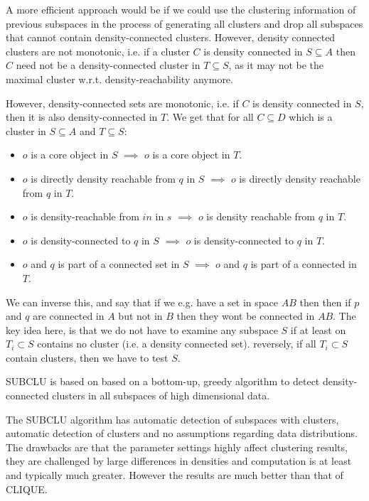     A more efficient approach would be if we could use the clustering 
    information of previous subspaces in the process of generating all clusters 
    and drop all subspaces that cannot contain density-connected clusters. 
    However, density connected clusters are not monotonic, i.e. if a cluster 
    $C$ is density connected in $S \subseteq A$ then $C$ need not be a 
    density-connected cluster in $T \subseteq S$, as it may not be the maximal 
    cluster w.r.t. density-reachability anymore. 
    
    However, density-connected sets are monotonic, i.e. if $C$ is density 
    connected in $S$, then it is also density-connected in $T$. We get that for 
    all $C \subseteq D$ which is a cluster in $S \subseteq A$ and $T \subseteq 
    S$:
    
    \begin{itemize}
        \item $o$ is a core object in $S$ $\implies$ $o$ is a core object in 
        $T$.
        \item $o$ is directly density reachable from $q$ in $S$ $\implies$ $o$ 
        is directly density reachable from $q$ in $T$.
        \item $o$ is density-reachable from $in$ in $s$ $\implies$ $o$ is 
        density reachable from $q$ in $T$.
        \item $o$ is density-connected to $q$ in $S$ $\implies$ $o$ is 
        density-connected to $q$ in $T$.
        \item $o$ and $q$ is part of a connected set in $S$ $\implies$ $o$ and 
        $q$ is part of a connected in $T$.
    \end{itemize}

    We can inverse this, and say that if we e.g. have a set in space $AB$ then 
    then if $p$ and $q$ are connected in $A$ but not in $B$ then they wont be 
    connected in $AB$. The key idea here, is that we do not have to examine any 
    subspace $S$ if at least on $T_i \subset S$ contains no cluster (i.e. a 
    density connected set). reversely, if all $T_i \subset S$ contain clusters, 
    then we have to test $S$.
    
    SUBCLU is based on based on a bottom-up, greedy algorithm to detect 
    density-connected clusters in all subspaces of high dimensional data.
    
    The SUBCLU algorithm has automatic detection of subspaces with clusters, 
    automatic detection of clusters and no assumptions regarding data 
    distributions. The drawbacks are that the parameter settings highly affect 
    clustering results, they are challenged by large differences in densities 
    and computation is at least  and typically much greater. However 
    the results are much better than that of CLIQUE.
    
